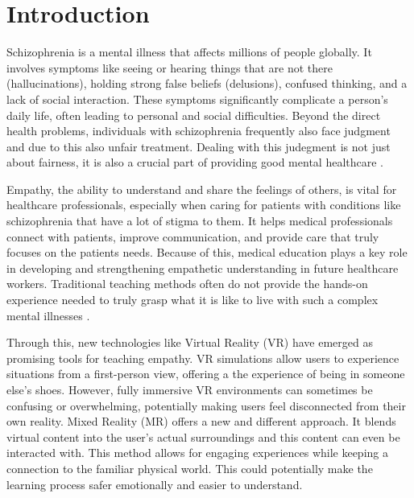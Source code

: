 \chapter{Introduction}
\label{ch:introduction}


Schizophrenia is a mental illness that affects millions of people globally. It involves symptoms like seeing or hearing things that are not there (hallucinations), holding strong false beliefs (delusions), confused thinking, and a lack of social interaction. These symptoms significantly complicate a person's daily life, often leading to personal and social difficulties. Beyond the direct health problems, individuals with schizophrenia frequently also face judgment and due to this also unfair treatment. Dealing with this judegment is not just about fairness, it is also a crucial part of providing good mental healthcare \cite{Shrivastava2011}.

\vspace{1em}

Empathy, the ability to understand and share the feelings of others, is vital for healthcare professionals, especially when caring for patients with conditions like schizophrenia that have a lot of stigma to them. It helps medical professionals connect with patients, improve communication, and provide care that truly focuses on the patients needs. Because of this, medical education plays a key role in developing and strengthening empathetic understanding in future healthcare workers. Traditional teaching methods often do not provide the hands-on experience needed to truly grasp what it is like to live with such a complex mental illnesses \cite{Ruffalo2024}.

\vspace{1em}

Through this, new technologies like Virtual Reality (VR) have emerged as promising tools for teaching empathy. VR simulations allow users to experience situations from a first-person view, offering a the experience of being in someone else's shoes. However, fully immersive VR environments can sometimes be confusing or overwhelming, potentially making users feel disconnected from their own reality. Mixed Reality (MR) offers a new and different approach. It blends virtual content into the user's actual surroundings and this content can even be interacted with. This method allows for engaging experiences while keeping a connection to the familiar physical world. This could potentially make the learning process safer emotionally and easier to understand.

